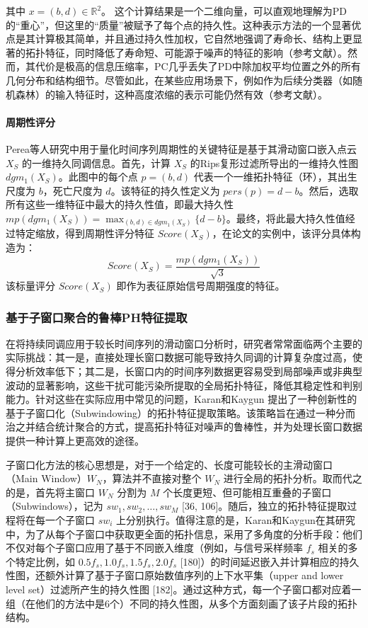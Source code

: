                     其中 $x = (b, d) \in \mathbb{R}^2$。                    
           这个计算结果是一个二维向量，可以直观地理解为PD的“重心”，但这里的“质量”被赋予了每个点的持久性。这种表示方法的一个显著优点是其计算极其简单，并且通过持久性加权，它自然地强调了寿命长、结构上更显著的拓扑特征，同时降低了寿命短、可能源于噪声的特征的影响（参考文献）。然而，其代价是极高的信息压缩率，PC几乎丢失了PD中除加权平均位置之外的所有几何分布和结构细节。尽管如此，在某些应用场景下，例如作为后续分类器（如随机森林）的输入特征时，这种高度浓缩的表示可能仍然有效（参考文献\cite{JSJC202406009}）。

            \paragraph{周期性评分}
Perea等人\cite{perea2015sliding}研究中用于量化时间序列周期性的关键特征是基于其滑动窗口嵌入点云 $X_S$ 的一维持久同调信息。首先，计算 $X_S$ 的Rips复形过滤所导出的一维持久性图 $dgm_1(X_S)$。此图中的每个点 $p=(b,d)$ 代表一个一维拓扑特征（环），其出生尺度为 $b$，死亡尺度为 $d$。该特征的持久性定义为 $pers(p) = d-b$。然后，选取所有这些一维特征中最大的持久性值，即最大持久性 $mp(dgm_1(X_S)) = \max_{(b,d) \in dgm_1(X_S)} \{d-b\}$。最终，将此最大持久性值经过特定缩放，得到周期性评分特征 $Score(X_S)$，在论文的实例中，该评分具体构造为：
\begin{equation}
Score(X_S) = \frac{mp(dgm_1(X_S))}{\sqrt{3}}
\end{equation}
该标量评分 $Score(X_S)$ 即作为表征原始信号周期强度的特征。
        \subsubsection{基于子窗口聚合的鲁棒PH特征提取}
        在将持续同调应用于较长时间序列的滑动窗口分析时，研究者常常面临两个主要的实际挑战：其一是，直接处理长窗口数据可能导致持久同调的计算复杂度过高，使得分析效率低下；其二是，长窗口内的时间序列数据更容易受到局部噪声或非典型波动的显著影响，这些干扰可能污染所提取的全局拓扑特征，降低其稳定性和判别能力。针对这些在实际应用中常见的问题，Karan和Kaygun \cite{3} 提出了一种创新性的基于子窗口化（Subwindowing）的拓扑特征提取策略。该策略旨在通过一种分而治之并结合统计聚合的方式，提高拓扑特征对噪声的鲁棒性，并为处理长窗口数据提供一种计算上更高效的途径。

        子窗口化方法的核心思想是，对于一个给定的、长度可能较长的主滑动窗口（Main Window）$W_N$，算法并不直接对整个 $W_N$ 进行全局的拓扑分析。取而代之的是，首先将主窗口 $W_N$ 分割为 $M$ 个长度更短、但可能相互重叠的子窗口（Subwindows），记为 $sw_1, sw_2, \dots, sw_M$ [36, 106]。随后，独立的拓扑特征提取过程将在每一个子窗口 $sw_i$ 上分别执行。值得注意的是，Karan和Kaygun在其研究中，为了从每个子窗口中获取更全面的拓扑信息，采用了多角度的分析手段：他们不仅对每个子窗口应用了基于不同嵌入维度（例如，与信号采样频率 $f_s$ 相关的多个特定比例，如 $0.5f_s, 1.0f_s, 1.5f_s, 2.0f_s$ [180]）的时间延迟嵌入并计算相应的持久性图，还额外计算了基于子窗口原始数值序列的上下水平集（upper and lower level set）过滤所产生的持久性图 [182]。通过这种方式，每一个子窗口都对应着一组（在他们的方法中是6个）不同的持久性图，从多个方面刻画了该子片段的拓扑结构。
        
